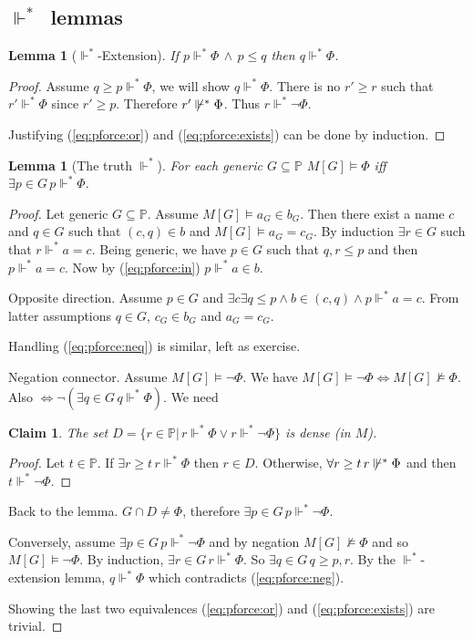 \documentclass[11pt,pdftex,twoside,a4paper]{article}
\newcommand{\dsP}{\ensuremath{\mathds{P}}}
\newcommand{\forcesstar}{\ensuremath{\Vdash^*}}
\newtheorem{lemma}[thm]{Lemma}
\newtheorem{claim}[thm]{Claim}
\theoremstyle{definition}
\begin{document}
\subsection{\forcesstar\ lemmas}

\begin{lemma}[\forcesstar-Extension]
If \(p \forcesstar \Phi\,\land\,p \leq q\) then \(q\forcesstar \Phi\).
\end{lemma}
\begin{proof}
Assume \(q\geq p \forcesstar \Phi\), we will show \(q\forcesstar \Phi\).
There is no \(r'\geq r\) such that \(r'\forcesstar \Phi\)
since \(r' \geq p\).
Therefore \(r' \not\forcesstar \Phi\). Thus \(r \forcesstar \neg \Phi\).

Justifying (\ref{eq:pforce:or}) and (\ref{eq:pforce:exists})
can be done by induction.
\end{proof}

\begin{lemma}[The truth \forcesstar]
For each generic \(G\subseteq \dsP\)
\(M[G] \models \Phi\)
iff \(\exists p\in G\, p\forcesstar \Phi\).
\end{lemma}
\begin{proof}
Let generic \(G\subseteq \dsP\). Assume \(M[G] \models a_G \in b_G\).
Then there exist a name $c$ and \(q\in G\) such that \((c,q)\in b\)
and \(M[G] \models a_G = c_G\). By induction \(\exists r\in G\)
such that \(r\forcesstar a=c\). Being generic, we have \(p\in G\)
such that \(q,r\leq p\) and then \(p\forcesstar a=c\).
Now by (\ref{eq:pforce:in}) \(p\forcesstar a\in b\).

Opposite direction. Assume \(p\in G\) and
 \(\exists c \exists q\leq p \land b\in(c,q) \land p \forcesstar a=c\).
From latter assumptions \(q\in G\), \(c_G\in b_G\) and \(a_G = c_G\).

Handling (\ref{eq:pforce:neq}) is similar, left as exercise.

Negation connector. Assume
 \(M[G] \models\neg\Phi\).
We have
 \(M[G] \models\neg\Phi \Leftrightarrow M[G] \not\models\Phi\).
Also \(\Leftrightarrow \neg(\exists q\in G\, q\forcesstar \Phi)\).
We need
\begin{claim}
The set \(D = \{r\in\dsP|\, r\forcesstar\Phi \lor r\forcesstar \neg\Phi\}\)
is dense (in $M$).
\end{claim}
\begin{proof}
Let \(t\in\dsP\). If \(\exists r\geq t\, r\forcesstar\Phi\) then \(r\in D\).
Otherwise, \(\forall r\geq t\, r \not\forcesstar \Phi\)
and then \(t\forcesstar\neg\Phi\).
\end{proof}
Back to the lemma. \(G\cap D\neq \Phi\),
therefore \(\exists p\in G\, p\forcesstar \neg\Phi\).

Conversely, assume \(\exists p\in G\, p\forcesstar \neg\Phi\)
and by negation \(M[G]\not\models\Phi\) and so \(M[G]\models\neg\Phi\).
By induction, \(\exists r\in G\, r\forcesstar\Phi\).
So \(\exists q\in G\,q\geq p,r\). By the \forcesstar-extension lemma,
\(q\forcesstar\Phi\) which contradicts (\ref{eq:pforce:neg}).

Showing the last two equivalences
(\ref{eq:pforce:or}) and (\ref{eq:pforce:exists}) are trivial.
\end{proof}
\end{document}
